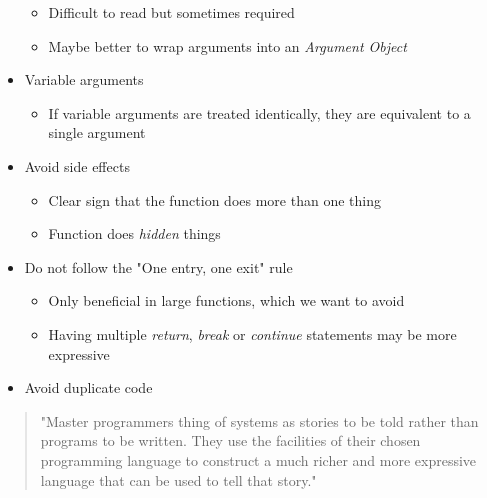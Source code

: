 \begin{itemize}
\begin{itemize}
        \item Difficult to read but sometimes required
        \item Maybe better to wrap arguments into an \textit{Argument Object}
    \end{itemize}
    \item Variable arguments
    \begin{itemize}
        \item If variable arguments are treated identically, they are equivalent to a single argument
    \end{itemize}
    \item Avoid side effects
    \begin{itemize}
        \item Clear sign that the function does more than one thing
        \item Function does \textit{hidden} things
    \end{itemize}
    \item Do not follow the "One entry, one exit" rule
    \begin{itemize}
        \item Only beneficial in large functions, which we want to avoid
        \item Having multiple \textit{return}, \textit{break} or \textit{continue} statements may be more expressive
    \end{itemize}
    \item Avoid duplicate code
\end{itemize}
\begin{quote}
    "Master programmers thing of systems as stories to be told rather than programs to be written.
    They use the facilities of their chosen programming language to construct a much richer and more expressive language
    that can be used to tell that story."
\end{quote}